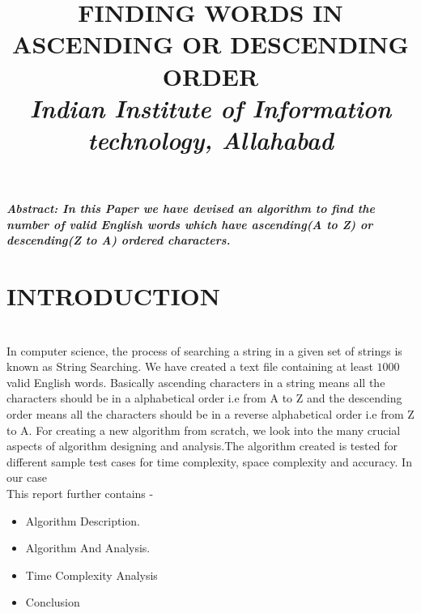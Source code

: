 \documentclass[conference]{IEEEtran}
\begin{document}
\title{FINDING WORDS IN ASCENDING OR DESCENDING ORDER \\
\textit{\Large{Indian Institute of Information technology, Allahabad }}\\
}
\author{
\and
{}
\and
{}
}

\maketitle
{\textbf{\textit{Abstract: In this Paper we have devised an algorithm to find the number of valid English words which have ascending(A to Z) or descending(Z to A) ordered characters.
\\ }}}
\maketitle

\section{INTRODUCTION}\\
In computer science, the process of searching a 
string in a given set of strings is known as 
String Searching. We have created a text file 
containing at least $1000$ valid English words. 
Basically ascending characters in a string 
means all the characters should be in a 
alphabetical order i.e from A to Z and the 
descending order means all the characters 
should be in a reverse alphabetical order i.e 
from Z to A. For creating a new algorithm from 
scratch, we look into the many crucial aspects 
of algorithm designing and analysis.The 
algorithm created is tested for different sample 
test cases for time complexity, space 
complexity and accuracy. In our case 
\\ This report further contains - 
\begin{itemize}
    \item Algorithm Description.
    \item Algorithm And  Analysis.
    \item Time Complexity Analysis 
    \item Conclusion\
\end{itemize}
\end{document}
